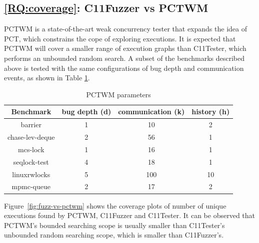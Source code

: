 \subsection{\ref*{RQ:coverage}: C11Fuzzer vs PCTWM}

PCTWM \cite{pctwm} is a state-of-the-art weak concurrency tester that expands the idea of PCT, which constrains the cope of exploring executions. It is expected that PCTWM will cover a smaller range of execution graphs than C11Tester, which performs an unbounded random search. A subset of the benchmarks described above is tested with the same configurations of bug depth and communication events, as shown in Table \ref{pctwm-configs}.

\begin{table}[h]
	\centering
	\begin{tabular}{ |c|ccc| }
		\hline
		Benchmark       & bug depth (d) & communication (k) & history (h) \\
		\hline
		barrier         & 1             & 10                & 2           \\
		chase-lev-deque & 2             & 56                & 1           \\
		mcs-lock        & 1             & 16                & 1           \\
		seqlock-test    & 4             & 18                & 1           \\
		linuxrwlocks    & 5             & 100               & 10          \\
		mpmc-queue      & 2             & 17                & 2           \\
		\hline
	\end{tabular}
	\caption{PCTWM parameters}
	\label{pctwm-configs}
\end{table}

Figure~\ref{fig:fuzz-vs-pctwm} shows the coverage plots of number of unique executions found by PCTWM, C11Fuzzer and C11Tester. It can be observed that PCTWM's bounded searching scope is usually smaller than C11Tester's unbounded random searching scope, which is smaller than C11Fuzzer's.


